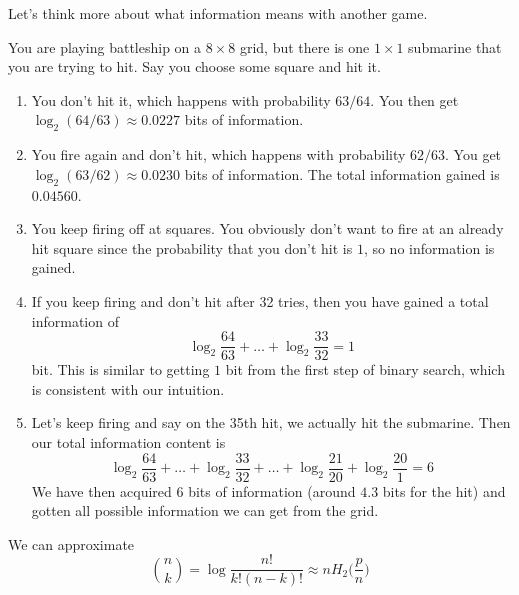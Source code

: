 \documentclass{article}
\begin{document}
    Let's think more about what information means with another game. 

    \begin{example}[Submarines]
      You are playing battleship on a $8 \times 8$ grid, but there is one $1 \times 1$ submarine that you are trying to hit. Say you choose some square and hit it. 
      \begin{enumerate}
        \item You don't hit it, which happens with probability $63/64$. You then get $\log_2 (64/63) \approx 0.0227$ bits of information. 

        \item You fire again and don't hit, which happens with probability $62/63$. You get $\log_2 (63/62) \approx 0.0230$ bits of information. The total information gained is $0.04560$. 

        \item You keep firing off at squares. You obviously don't want to fire at an already hit square since the probability that you don't hit is $1$, so no information is gained. 

        \item If you keep firing and don't hit after 32 tries, then you have gained a total information of 
        \begin{equation}
          \log_2 \frac{64}{63} + \ldots + \log_2 \frac{33}{32} = 1
        \end{equation}
        bit. This is similar to getting $1$ bit from the first step of binary search, which is consistent with our intuition. 

        \item Let's keep firing and say on the 35th hit, we actually hit the submarine. Then our total information content is 
        \begin{equation}
          \log_2 \frac{64}{63} + \ldots + \log_2 \frac{33}{32} + \ldots + \log_2 \frac{21}{20} + \log_2 \frac{20}{1} = 6
        \end{equation}
        We have then acquired 6 bits of information (around $4.3$ bits for the hit) and gotten all possible information we can get from the grid. 
      \end{enumerate}
    \end{example}

    \begin{lemma}
      We can approximate 
      \begin{equation}
        \binom{n}{k} = \log \frac{n!}{k! (n-k)!} \approx n H_2 \bigg( \frac{p}{n} \bigg)
      \end{equation}
    \end{lemma}
\end{document}
